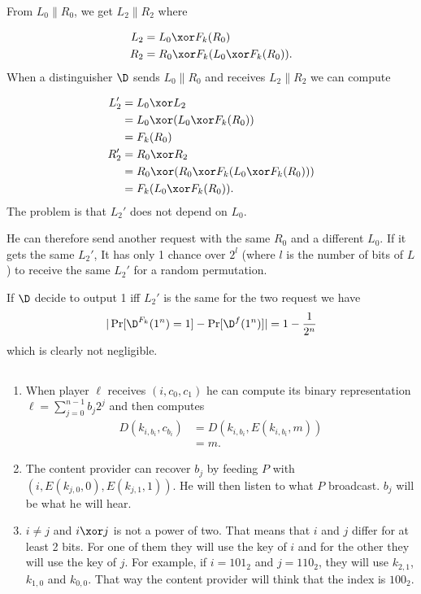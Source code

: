 
\begin{solution}
	From $L_0\|R_0$, we get $L_2\|R_2$
	where
	
	\begin{align*}
		L_2 & = L_0 \xor F_k(R_0)\\
		R_2 & = R_0 \xor F_k(L_0 \xor F_k(R_0)).
	\end{align*}
	When a distinguisher $\D$ sends $L_0\|R_0$ and receives
	$L_2\|R_2$ we can
	compute
	
	\begin{align*}
		L_2' & = L_0 \xor L_2\\
		& = L_0 \xor (L_0 \xor F_k(R_0))\\
		& = F_k(R_0)\\
		R_2' & = R_0 \xor R_2\\
		& = R_0 \xor (R_0 \xor F_k(L_0 \xor F_k(R_0)))\\
		& = F_k(L_0 \xor F_k(R_0)).
	\end{align*}
	The problem is that $L_2'$ does not depend on $L_0$.
	
	He can therefore send another request with the same $R_0$
	and a different $L_0$.
	If it gets the same $L_2'$,
	It has only 1 chance over $2^l$ (where $l$ is the number of bits of $L$) to receive the same $L_2'$ for a random permutation.
	
	If $\D$ decide to output 1 iff $L_2'$ is the same for the two request we have
	\[ |\Pr[\D^{F_k}(1^n) = 1] -\Pr[\D^f(1^n)]| = 1 - \frac{1}{2^n} \]
	which is clearly not negligible.
\end{solution}

\subsection{}
\begin{solution}
	\begin{enumerate}
		\item When player $\ell$ receives $(i,c_0,c_1)$ he can compute its binary representation $\ell = \sum_{j=0}^{n-1} b_j2^j$
		and then computes
		\begin{align*}
			D(k_{i,b_i}, c_{b_i})
			& = D(k_{i,b_i}, E(k_{i,b_i}, m))\\
			& = m.
		\end{align*}
		\item The content provider can recover $b_j$ by feeding $P$ with $(i,E(k_{j,0},0),E(k_{j,1},1))$.
		He will then listen to what $P$ broadcast.
		$b_j$ will be what he will hear.
		\item $i \neq j$ and $i \xor j$ is not a power of two.
		That means that $i$ and $j$ differ for at least 2 bits.
		For one of them they will use the key of $i$ and for the other they will use the key of $j$.
		For example, if $i = 101_2$ and $j = 110_2$, they will use $k_{2,1}$, $k_{1,0}$ and $k_{0,0}$.
		That way the content provider will think that the index is $100_2$.
	\end{enumerate}
\end{solution}

